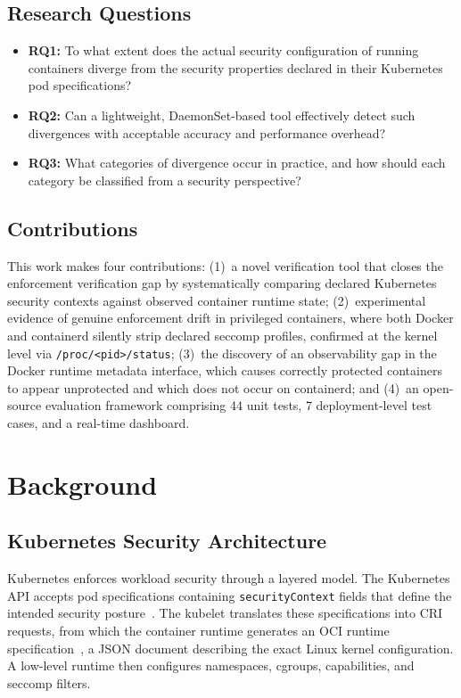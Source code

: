 \documentclass[sigconf]{acmart}
\begin{document}
\subsection{Research Questions}

\begin{itemize}
    \item \textbf{RQ1:} To what extent does the actual security configuration of running containers diverge from the security properties declared in their Kubernetes pod specifications?
    \item \textbf{RQ2:} Can a lightweight, DaemonSet-based tool effectively detect such divergences with acceptable accuracy and performance overhead?
    \item \textbf{RQ3:} What categories of divergence occur in practice, and how should each category be classified from a security perspective?
\end{itemize}

\subsection{Contributions}

This work makes four contributions: (1)~a novel verification tool that closes the enforcement verification gap by systematically comparing declared Kubernetes security contexts against observed container runtime state; (2)~experimental evidence of genuine enforcement drift in privileged containers, where both Docker and containerd silently strip declared seccomp profiles, confirmed at the kernel level via \texttt{/proc/<pid>/status}; (3)~the discovery of an observability gap in the Docker runtime metadata interface, which causes correctly protected containers to appear unprotected and which does not occur on containerd; and (4)~an open-source evaluation framework comprising 44 unit tests, 7 deployment-level test cases, and a real-time dashboard.

\section{Background}

\subsection{Kubernetes Security Architecture}

Kubernetes enforces workload security through a layered model. The Kubernetes API accepts pod specifications containing \texttt{securityContext} fields that define the intended security posture~\cite{k8sseccomp2024}. The kubelet translates these specifications into CRI requests, from which the container runtime generates an OCI runtime specification~\cite{ocispec2023}, a JSON document describing the exact Linux kernel configuration. A low-level runtime then configures namespaces, cgroups, capabilities, and seccomp filters.
\end{document}
